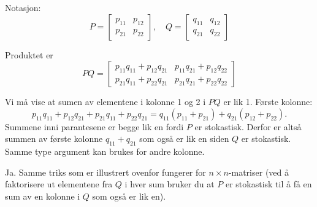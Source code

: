 \begin{losning}

\begin{punkt}
Notasjon: $$P=\begin{bmatrix}
p_{11} & p_{12}\\
p_{21} & p_{22}
\end{bmatrix},\quad Q=\begin{bmatrix}
q_{11} & q_{12}\\
q_{21} & q_{22}
\end{bmatrix}$$

Produktet er $$PQ=\begin{bmatrix}
p_{11}q_{11}+p_{12}q_{21} & p_{11}q_{21}+p_{12}q_{22}\\
p_{21}q_{11}+p_{22}q_{21} & p_{21}q_{21}+p_{22}q_{22}
\end{bmatrix}$$
\end{punkt}

Vi må vise at sumen av elementene i kolonne 1 og 2 i $PQ$ er lik 1. Første kolonne: $$p_{11}q_{11}+p_{12}q_{21}+p_{21}q_{11}+p_{22}q_{21}=q_{11}(p_{11}+p_{21})+q_{21}(p_{12}+p_{22}).$$ Summene inni parantesene er begge lik en fordi $P$ er stokastisk. Derfor er altså summen av første kolonne $q_{11}+q_{21}$ som også er lik en siden $Q$ er stokastisk. Samme type argument kan brukes for andre kolonne.

\begin{punkt}
Ja. Samme triks som er illustrert ovenfor fungerer for $n\times n$-matriser (ved å faktorisere ut elementene fra $Q$ i hver sum bruker du at $P$ er stokastisk til å få en sum av en kolonne i $Q$ som også er lik en). 
\end{punkt}

\end{losning}
